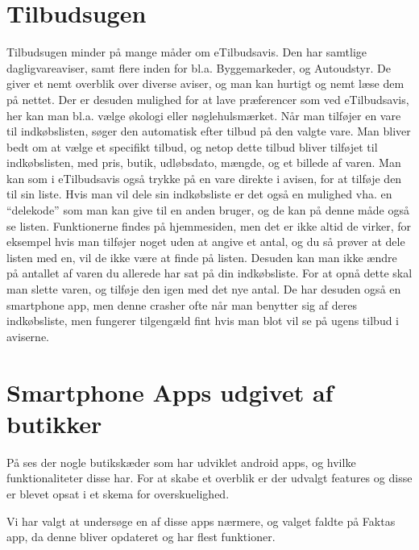 \section{Tilbudsugen}

Tilbudsugen minder på mange måder om eTilbudsavis. 
Den har samtlige dagligvareaviser, samt flere inden for bl.a. Byggemarkeder, og Autoudstyr.
De giver et nemt overblik over diverse aviser, og man kan hurtigt og nemt læse dem på nettet. 
Der er desuden mulighed for at lave præferencer som ved eTilbudsavis, her kan man bl.a. vælge økologi eller nøglehulsmærket.
Når man tilføjer en vare til indkøbslisten, søger den automatisk efter tilbud på den valgte vare. 
Man bliver bedt om at vælge et specifikt tilbud, og netop dette tilbud bliver tilføjet til indkøbslisten, med pris, butik, udløbsdato, mængde, og et billede af varen.
Man kan som i eTilbudsavis også trykke på en vare direkte i avisen, for at tilføje den til sin liste.
Hvis man vil dele sin indkøbsliste er det også en mulighed vha. en ``delekode'' som man kan give til en anden bruger, og de kan på denne måde også se listen.
Funktionerne findes på hjemmesiden, men det er ikke altid de virker, for eksempel hvis man tilføjer noget uden at angive et antal, og du så prøver at dele listen med en, vil de ikke være at finde på listen.
Desuden kan man ikke ændre på antallet af varen du allerede har sat på din indkøbsliste. 
For at opnå dette skal man slette varen, og tilføje den igen med det nye antal.
De har desuden også en smartphone app, men denne crasher ofte når man benytter sig af deres indkøbsliste, men fungerer tilgengæld fint hvis man blot vil se på ugens tilbud i aviserne.

\section{Smartphone Apps udgivet af butikker}
På  ses der nogle butikskæder som har udviklet android apps, og hvilke funktionaliteter disse har.  
For at skabe et overblik er der udvalgt features og disse er blevet opsat i et skema for overskuelighed. 

Vi har valgt at undersøge en af disse apps nærmere, og valget faldte på Faktas app,
da denne bliver opdateret og har flest funktioner. 
